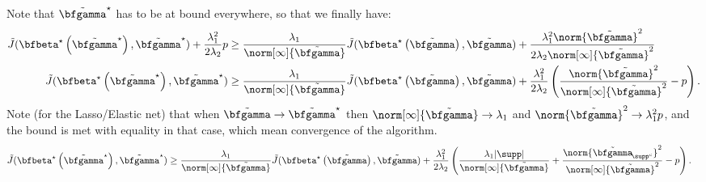 Note that $\tilde\bfgamma^\star$ has to be at bound everywhere, so that we
finally have:
\begin{align*}
  \tilde J(\bfbeta^\star\left(\tilde\bfgamma^\star\right),\tilde\bfgamma^\star) 
  + \frac{\lambda_1^{2}}{2\lambda_2} p
  & \geq
  \frac{\lambda_1}{\norm[\infty]{\tilde\bfgamma}} \tilde J(\bfbeta^\star\left(\tilde\bfgamma\right),\tilde\bfgamma) + 
  \frac{\lambda_1^2\norm{\tilde\bfgamma}^2}{2 \lambda_2 \norm[\infty]{\tilde\bfgamma}^2}
  \\
  \tilde J(\bfbeta^\star\left(\tilde\bfgamma^\star\right),\tilde\bfgamma^\star) 
  & \geq
  \frac{\lambda_1}{\norm[\infty]{\tilde\bfgamma}} \tilde J(\bfbeta^\star\left(\tilde\bfgamma\right),\tilde\bfgamma) + 
  \frac{\lambda_1^2}{2 \lambda_2} \left( \frac{\norm{\tilde\bfgamma}^2}{\norm[\infty]{\tilde\bfgamma}^2}-p\right).
\end{align*}
Note (for the Lasso/Elastic net) that when $\tilde\bfgamma\to\tilde\bfgamma^{\star}$ then
$\norm[\infty]{\tilde\bfgamma}\to\lambda_1$  and $\norm{\tilde\bfgamma}^2\to
\lambda_1^2p$, and the bound is  met with equality in that case, which
mean convergence of the algorithm.
\begin{align*}
  \tilde J(\bfbeta^\star\left(\tilde\bfgamma^\star\right),\tilde\bfgamma^\star) 
  & \geq
  \frac{\lambda_1}{\norm[\infty]{\tilde\bfgamma}} \tilde J(\bfbeta^\star\left(\tilde\bfgamma\right),\tilde\bfgamma) + 
  \frac{\lambda_1^2}{2 \lambda_2} \left(
    \frac{\lambda_{1}|\supp|}{\norm[\infty]{\tilde\bfgamma}} +
    \frac{\norm{\tilde\bfgamma_{\!\supp^c}}^2}{\norm[\infty]{\tilde\bfgamma}^2} -p
  \right).
\end{align*}
